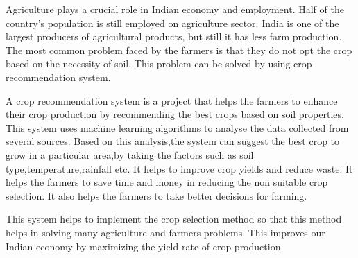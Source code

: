 \hspace{0.5in}
      Agriculture plays a crucial role in Indian economy and employment. Half of the country's population is still employed on agriculture sector. India is one of the largest producers of agricultural products, but still it has less farm production. The most common problem faced by the farmers is that they do not opt the crop based on the necessity of soil. This problem can be solved by using crop recommendation system.\par
A crop recommendation system is a project that helps the farmers to enhance their crop production by recommending the best crops based on soil properties. This system uses machine learning algorithms to analyse the data collected from several sources. Based on this analysis,the system can  suggest the best crop to grow in a particular area,by taking the factors such as soil type,temperature,rainfall etc. It helps to improve crop yields and reduce waste. It helps the farmers to save time and money in reducing the non suitable crop selection. It also helps the farmers to take better decisions for farming.\par
This system helps to implement the crop selection method so that this method helps in solving many agriculture and farmers problems. This improves our Indian economy by maximizing the yield rate of crop production.

